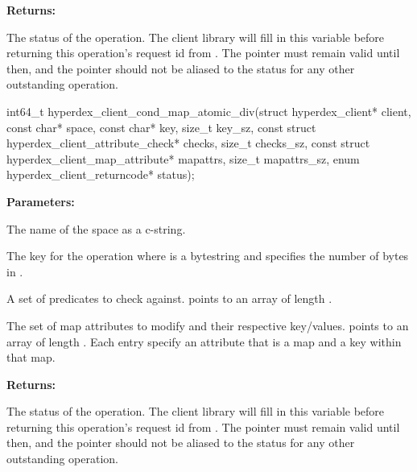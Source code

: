 \noindent\textbf{Returns:}
\begin{description}[labelindent=\widthof{{\code{status}}},leftmargin=*,noitemsep,nolistsep,align=right]
\item[\code{status}] The status of the operation.  The client library will fill in this variable before returning this operation's request id from .  The pointer must remain valid until then, and the pointer should not be aliased to the status for any other outstanding operation.
\end{description}

\funcsep
{}
\begin{ccode}
int64_t hyperdex_client_cond_map_atomic_div(struct hyperdex_client* client,
                const char* space,
                const char* key, size_t key_sz,
                const struct hyperdex_client_attribute_check* checks, size_t checks_sz,
                const struct hyperdex_client_map_attribute* mapattrs, size_t mapattrs_sz,
                enum hyperdex_client_returncode* status);
\end{ccode}
\funcdesc 

\noindent\textbf{Parameters:}
\begin{description}[labelindent=\widthof{{\code{mapattrs}, \code{mapattrs\_sz}}},leftmargin=*,noitemsep,nolistsep,align=right]
\item[\code{space}] The name of the space as a c-string.
\item[\code{key}, \code{key\_sz}] The key for the operation where  is a bytestring and  specifies the number of bytes in .
\item[\code{checks}, \code{checks\_sz}] A set of predicates to check against.   points to an array of length .
\item[\code{mapattrs}, \code{mapattrs\_sz}] The set of map attributes to modify and their respective key/values.   points to an array of length .  Each entry specify an attribute that is a map and a key within that map.
\end{description}

\noindent\textbf{Returns:}
\begin{description}[labelindent=\widthof{{\code{status}}},leftmargin=*,noitemsep,nolistsep,align=right]
\item[\code{status}] The status of the operation.  The client library will fill in this variable before returning this operation's request id from .  The pointer must remain valid until then, and the pointer should not be aliased to the status for any other outstanding operation.
\end{description}

